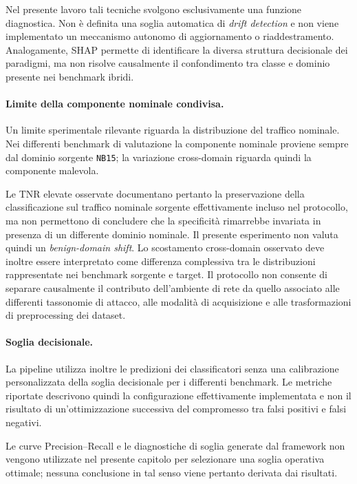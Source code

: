 Nel presente lavoro tali tecniche svolgono esclusivamente una funzione diagnostica. 
Non è definita una soglia automatica di \textit{drift detection} e non viene implementato un meccanismo autonomo di aggiornamento o riaddestramento. 
Analogamente, SHAP permette di identificare la diversa struttura decisionale dei paradigmi, ma non risolve causalmente il confondimento tra classe e dominio presente nei benchmark ibridi.

\paragraph{Limite della componente nominale condivisa.}
Un limite sperimentale rilevante riguarda la distribuzione del traffico nominale. 
Nei differenti benchmark di valutazione la componente nominale proviene sempre dal dominio sorgente \texttt{NB15}; la variazione cross-domain riguarda quindi la componente malevola.

Le TNR elevate osservate documentano pertanto la preservazione della classificazione sul traffico nominale sorgente effettivamente incluso nel protocollo, ma non permettono di concludere che la specificità rimarrebbe invariata in presenza di un differente dominio nominale. 
Il presente esperimento non valuta quindi un \textit{benign-domain shift}.
Lo scostamento cross-domain osservato deve inoltre essere interpretato come differenza complessiva tra le distribuzioni rappresentate nei benchmark sorgente e target. Il protocollo non consente di separare causalmente il contributo dell'ambiente di rete da quello associato alle differenti tassonomie di attacco, alle modalità di acquisizione e alle trasformazioni di preprocessing dei dataset.

\paragraph{Soglia decisionale.}
La pipeline utilizza inoltre le predizioni dei classificatori senza una calibrazione personalizzata della soglia decisionale per i differenti benchmark. 
Le metriche riportate descrivono quindi la configurazione effettivamente implementata e non il risultato di un'ottimizzazione successiva del compromesso tra falsi positivi e falsi negativi.

Le curve Precision--Recall e le diagnostiche di soglia generate dal framework non vengono utilizzate nel presente capitolo per selezionare una soglia operativa ottimale; nessuna conclusione in tal senso viene pertanto derivata dai risultati.

